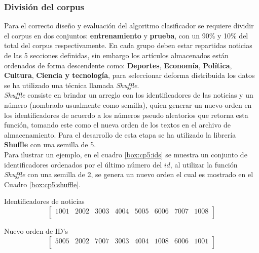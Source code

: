 \subsubsection{División del corpus}


Para el correcto diseño y evaluación del algoritmo clasificador se requiere dividir el corpus en dos conjuntos: \textbf{entrenamiento} y \textbf{prueba}, con un 90\% y 10\% del total del corpus respectivamente. En cada grupo deben estar repartidas noticias de las 5 secciones definidas, sin embargo los artículos almacenados están ordenados de forma descendente como: \textbf{Deportes}, \textbf{Economía}, \textbf{Política}, \textbf{Cultura}, \textbf{Ciencia y tecnología}, para seleccionar deforma distribuida los datos se ha utilizado una técnica llamada \textit{Shuffle}.\\

\textit{Shuffle} consiste en brindar un arreglo con los identificadores de las noticias y un número (nombrado usualmente como semilla), quien generar un nuevo orden en los identificadores de acuerdo a los números pseudo aleatorios que retorna esta función, tomando este como el nueva orden de los textos en el archivo de almacenamiento. Para el desarrollo de esta etapa se ha utilizado la librería \textbf{Shuffle} con una semilla de 5.\\

Para ilustrar un ejemplo, en el cuadro \ref{box:cp5:ids} se muestra un conjunto de identificadores ordenados por el último número del $id$, al utilizar la función \textit{Shuffle} con una semilla de 2, se genera un nuevo orden el cual es mostrado en el Cuadro \ref{box:cp5:shuffle}.\\


\begin{mygraybox}[label={box:cp5:ids}]{Identificadores de noticias} 
\begin{equation*}
\begin{bmatrix}
1001 & 2002 & 3003 & 4004 & 5005 & 6006 & 7007 & 1008\\ 
\end{bmatrix}
\end{equation*}
\end{mygraybox}


\begin{mygraybox}[label={box:cp5:shuffle}]{Nuevo orden de ID's} 
\begin{equation*}
\begin{bmatrix}
5005 & 2002 & 7007 & 3003 & 4004 & 1008 & 6006 & 1001\\
\end{bmatrix}
\end{equation*}
\end{mygraybox}

